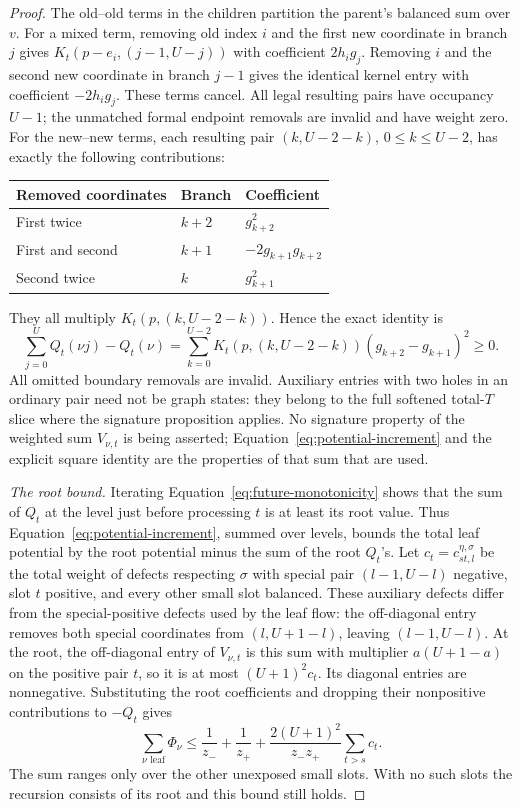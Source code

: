 \begin{proof}
The old--old terms in the children partition the parent's balanced sum
over $v$.  For a mixed term, removing old index $i$ and the first new
coordinate in branch $j$ gives
$K_t(p-e_i,(j-1,U-j))$ with coefficient $2h_i g_j$.
Removing $i$ and the second new coordinate in branch $j-1$ gives the
identical kernel entry with coefficient $-2h_i g_j$.
These terms cancel.  All legal resulting pairs have occupancy $U-1$;
the unmatched formal endpoint removals are invalid and have weight zero.
For the new--new terms, each resulting pair $(k,U-2-k)$, $0\le k\le U-2$,
has exactly the following contributions:
\begin{center}
\begin{tabular}{lll}
\toprule
Removed coordinates & Branch & Coefficient\\
\midrule
First twice & $k+2$ & $g_{k+2}^2$\\
First and second & $k+1$ & $-2g_{k+1}g_{k+2}$\\
Second twice & $k$ & $g_{k+1}^2$\\
\bottomrule
\end{tabular}
\end{center}
They all multiply $K_t(p,(k,U-2-k))$.  Hence the exact identity is
\begin{equation}\label{eq:future-square}
 \sum_{j=0}^U Q_t(\nu j)-Q_t(\nu)
 =\sum_{k=0}^{U-2}K_t(p,(k,U-2-k))
                      (g_{k+2}-g_{k+1})^2\ge0.
\end{equation}
All omitted boundary removals are invalid.  Auxiliary entries with two
holes in an ordinary pair need not be graph states: they belong to the
full softened total-$T$ slice where the signature proposition applies.
No signature property of the weighted sum $V_{\nu,t}$ is being asserted;
Equation~\eqref{eq:potential-increment} and the explicit square identity
are the properties of that sum that are used.

\emph{The root bound.}
Iterating Equation~\eqref{eq:future-monotonicity} shows that the sum of
$Q_t$ at the level just before processing $t$ is at least its root value.
Thus Equation~\eqref{eq:potential-increment}, summed over levels, bounds
the total leaf potential by the root potential minus the sum of the
root $Q_t$'s.  Let $c_t=c_{st,l}^{\eta,\sigma}$ be the total weight of
defects respecting $\sigma$ with special pair $(l-1,U-l)$ negative,
slot $t$ positive, and every other small slot balanced.
These auxiliary defects differ from the special-positive defects used by
the leaf flow: the off-diagonal entry removes both special coordinates
from $(l,U+1-l)$, leaving $(l-1,U-l)$.
At the root, the off-diagonal entry of $V_{\nu,t}$ is this sum with
multiplier $a(U+1-a)$ on the positive pair $t$, so it is at most
$(U+1)^2c_t$.  Its diagonal entries are nonnegative.  Substituting the
root coefficients and dropping their nonpositive contributions to
$-Q_t$ gives
\begin{equation}\label{eq:leaf-potential}
 \sum_{\nu\text{ leaf}}\Phi_\nu
 \le \frac1{z_-}+\frac1{z_+}
       +\frac{2(U+1)^2}{z_-z_+}\sum_{t>s}c_t.
\end{equation}
The sum ranges only over the other unexposed small slots.  With no such
slots the recursion consists of its root and this bound still holds.


\end{proof}
